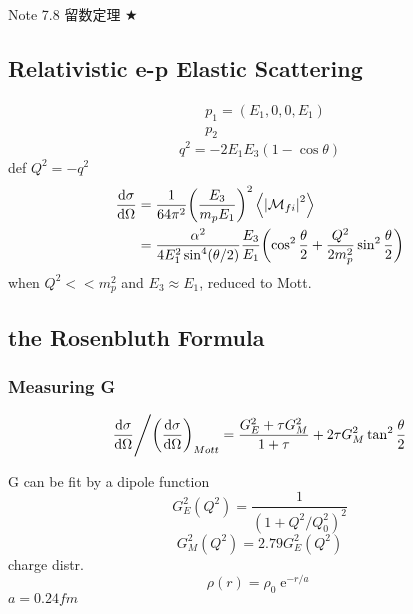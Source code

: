 \documentclass[a4paper]{article}
\DeclareMathOperator{\e}{\mathrm{e}}
\numberwithin{equation}{section}
\begin{document}
Note 7.8 留数定理 $ \bigstar $
\subsection{Relativistic e-p Elastic Scattering}
\begin{equation}\label{key}
\begin{aligned}
&p_1 = (E_1, 0, 0 ,E_1)\\
&p_2
\end{aligned}
\end{equation}
\begin{equation}\label{key}
q^2 = -2E_1E_3(1 - \cos\theta)
\end{equation}
def $ Q^2 = -q^2 $
\begin{equation}\label{key}
\begin{aligned}
\dv{\sigma}{\Omega} &= \dfrac{1}{64\pi^2} \qty(\dfrac{E_3}{m_p E_1})^2 \ev{\abs{\mathcal{M}_{fi}}^2}\\
&= \dfrac{\alpha^2}{4E_1^2\sin^4(\theta/2)} \dfrac{E_3}{E_1} \qty(\cos^2\dfrac{\theta}{2} + \dfrac{Q^2}{2m_p^2}\sin^2\dfrac{\theta}{2})
\end{aligned}
\end{equation}
when $ Q^2 << m_p^2 $ and $ E_3 \approx E_1 $, reduced to Mott.

\subsection{the Rosenbluth Formula}



\subsubsection{Measuring G}
\begin{equation}\label{key}
\dv{\sigma}{\Omega} \Bigg/ \qty(\dv{\sigma}{\Omega})_{Mott} = \dfrac{G_E^2 + \tau G_M^2}{1 + \tau} + 2\tau G_M^2 \tan^2\dfrac{\theta}{2}
\end{equation}

G can be fit by a dipole function
\begin{equation}\label{key}
G_E^2(Q^2) = \dfrac{1}{(1 + Q^2/Q_0^2)^2}
\end{equation}
\begin{equation}\label{key}
G_M^2(Q^2) = 2.79G_E^2(Q^2)
\end{equation}
charge distr.
\begin{equation}\label{key}
\rho(r) = \rho_0 \e^{-r/a}
\end{equation}
$ a = 0.24 fm $
\end{document}
